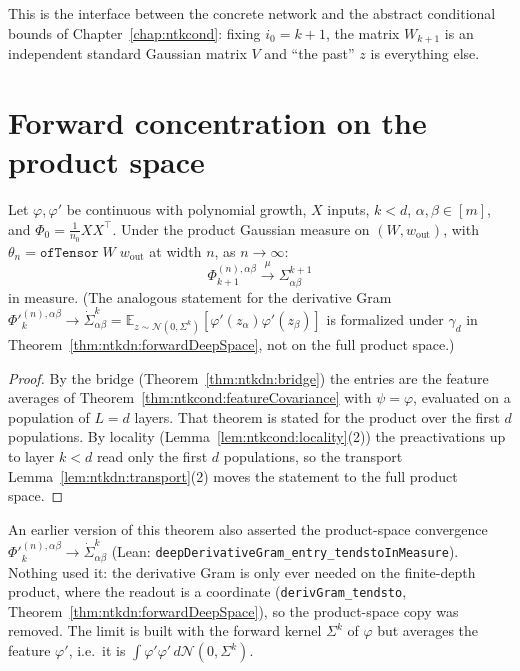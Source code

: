 This is the interface between the concrete network and the abstract conditional bounds of Chapter~\ref{chap:ntkcond}: fixing $i_0=k+1$, the matrix $W_{k+1}$ is an independent standard Gaussian matrix $V$ and ``the past'' $z$ is everything else.


\section{Forward concentration on the product space}\label{sec:ntkdn:forward}

\begin{theorem}\label{thm:ntkdn:forwardProductSpace}
  \leanok
Let $\varphi,\varphi'$ be continuous with polynomial growth, $X$ inputs, $k<d$, $\alpha,\beta\in[m]$, and $\Phi_0=\frac1{n_0}XX^\top$. Under the product Gaussian measure on $(W,w_{\mathrm{out}})$, with $\theta_n=\texttt{ofTensor}\;W\;w_{\mathrm{out}}$ at width $n$, as $n\to\infty$:
\[
  \Phi_{k+1}^{(n),\alpha\beta}\xrightarrow{\ \mu\ }\Sigma^{k+1}_{\alpha\beta}
\]
in measure. (The analogous statement for the derivative Gram
$\Phi'^{(n),\alpha\beta}_k\to\dot\Sigma^k_{\alpha\beta}=
\mathbb E_{z\sim\mathcal N(0,\Sigma^k)}[\varphi'(z_\alpha)\varphi'(z_\beta)]$ is formalized
under $\gamma_d$ in Theorem~\ref{thm:ntkdn:forwardDeepSpace}, not on the full product space.)
\end{theorem}

\begin{proof}
  \leanok
By the bridge (Theorem~\ref{thm:ntkdn:bridge}) the entries are the feature averages of Theorem~\ref{thm:ntkcond:featureCovariance} with $\psi=\varphi$, evaluated on a population of $L=d$ layers. That theorem is stated for the product over the first $d$ populations. By locality (Lemma~\ref{lem:ntkcond:locality}(2)) the preactivations up to layer $k<d$ read only the first $d$ populations, so the transport Lemma~\ref{lem:ntkdn:transport}(2) moves the statement to the full product space.
\end{proof}

\begin{remark}\label{rmk:ntkdn:forwardProductSpaceChange}
An earlier version of this theorem also asserted the product-space convergence
$\Phi'^{(n),\alpha\beta}_k\to\dot\Sigma^k_{\alpha\beta}$ (Lean:
\texttt{deepDerivativeGram\_entry\_tendstoInMeasure}). Nothing used it: the derivative Gram is
only ever needed on the finite-depth product, where the readout is a coordinate
(\texttt{derivGram\_tendsto}, Theorem~\ref{thm:ntkdn:forwardDeepSpace}), so the product-space
copy was removed. The limit is built with the forward kernel $\Sigma^k$ of $\varphi$ but averages
the feature $\varphi'$, i.e.\ it is $\int\varphi'\varphi'\,d\mathcal N(0,\Sigma^k)$.
\end{remark}


